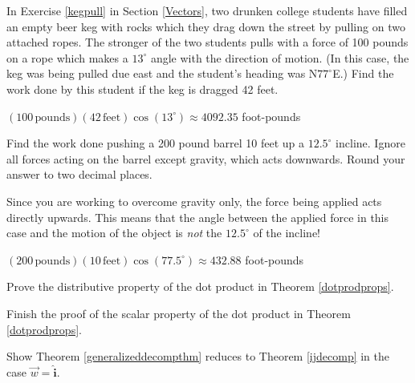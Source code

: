 \documentclass{ximera}
\begin{document}
\begin{problem}
In Exercise \ref{kegpull} in Section \ref{Vectors}, two drunken college students have filled an empty beer keg with rocks which they drag down the street by pulling on two attached ropes.  The stronger of the two students pulls with a force of 100 pounds on a rope which makes a $13^{\circ}$ angle with the direction of motion.  (In this case, the keg was being pulled due east and the student's heading was N$77^{\circ}$E.)  Find the work done by this student if the keg is dragged 42 feet.

\begin{solution}
$(100 \, \text{pounds})(42 \, \text{feet}) \cos\left(13^{\circ}\right) \approx 4092.35$ foot-pounds
\end{solution}
\end{problem}

\begin{problem}
Find the work done pushing a 200 pound barrel 10 feet up a $12.5^{\circ}$ incline. Ignore all forces acting on the barrel except gravity, which acts downwards.  Round your answer to two decimal places.

\begin{hint}
Since you are working to overcome gravity only, the force being applied acts directly upwards. This means that the angle between the applied force in this case and the motion of the object is \textit{not} the $12.5^{\circ}$ of the incline!
\end{hint}

\begin{solution}
$(200 \, \text{pounds})(10 \, \text{feet}) \cos\left(77.5^{\circ}\right) \approx 432.88$ foot-pounds
\end{solution}
\end{problem}

\begin{problem}
Prove the distributive property of the dot product in Theorem \ref{dotprodprops}.
\end{problem}

\begin{problem}
Finish the proof of the scalar property of the dot product in Theorem \ref{dotprodprops}.
\end{problem}

\begin{problem}
Show Theorem \ref{generalizeddecompthm} reduces to Theorem \ref{ijdecomp} in the case $\overrightarrow{w} =  \bm\hat{\text{i}}$.
\end{problem}
\end{document}
